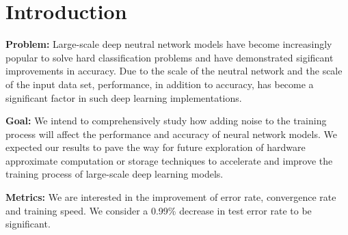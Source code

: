 \section{Introduction}
\label{sec:intro}


{\bf Problem:}
Large-scale deep neutral network models have become increasingly popular
to solve hard classification problems and have demonstrated sigificant
improvements in accuracy. Due to the scale of the neutral network and the
scale of the input data set, performance, in addition to accuracy, has
become a significant factor in such deep learning implementations.

{\bf Goal:}
We intend to comprehensively study how adding noise to the training
process will affect the performance and accuracy of neural network models.
We expected our results to pave the way for future exploration of
hardware approximate computation or storage techniques to accelerate
and improve the training process of large-scale deep learning models.

{\bf Metrics:} %
We are interested in the improvement of error rate, convergence rate
and training speed.
We consider a 0.99\% decrease in test error rate to be significant.




